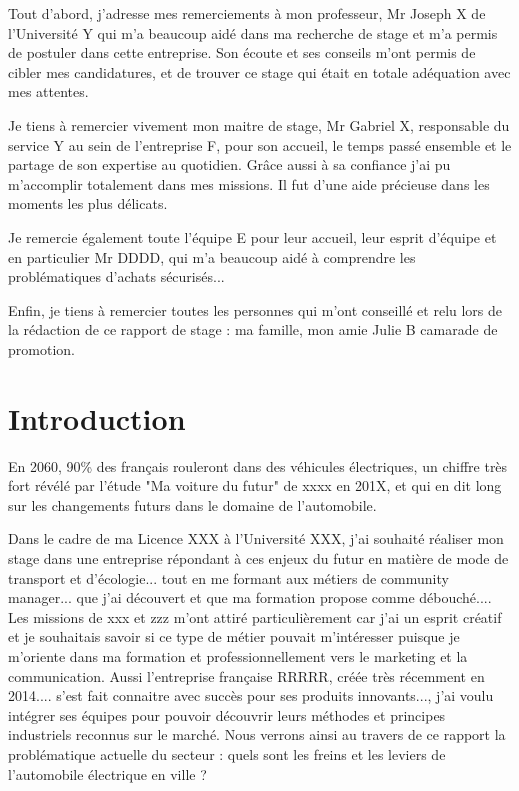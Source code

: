 \documentclass{article}
\begin{document}
Tout d'abord, j'adresse mes remerciements à mon professeur, Mr Joseph X de l'Université Y qui m'a beaucoup aidé dans ma recherche de stage et m'a permis de postuler dans cette entreprise. Son écoute et ses conseils m'ont permis de cibler mes candidatures, et de trouver ce stage qui était en totale adéquation avec mes attentes.

Je tiens à remercier vivement mon maitre de stage, Mr Gabriel X, responsable du service Y au sein de l'entreprise F, pour son accueil, le temps passé ensemble et le partage de son expertise au quotidien. Grâce aussi à sa confiance j'ai pu m'accomplir totalement dans mes missions. Il fut d'une aide précieuse dans les moments les plus délicats.

Je remercie également toute l'équipe E pour leur accueil, leur esprit d'équipe et en particulier Mr DDDD, qui m'a beaucoup aidé à comprendre les problématiques d'achats sécurisés...

Enfin, je tiens à remercier toutes les personnes qui m'ont conseillé et relu lors de la rédaction de ce rapport de stage : ma famille, mon amie Julie B camarade de promotion.


\newpage

\section{Introduction}


En 2060, 90\% des français rouleront dans des véhicules électriques, un chiffre très fort révélé par l'étude "Ma voiture du futur" de xxxx en 201X, et qui en dit long sur les changements futurs dans le domaine de l'automobile.

Dans le cadre de ma Licence XXX à l'Université XXX, j'ai souhaité réaliser mon stage dans une entreprise répondant à ces enjeux du futur en matière de mode de transport et d'écologie... tout en me formant aux métiers de community manager... que j'ai découvert et que ma formation propose comme débouché.... Les missions de xxx et zzz m'ont attiré particulièrement car j'ai un esprit créatif et je souhaitais savoir si ce type de métier pouvait m'intéresser puisque je m'oriente dans ma formation et professionnellement vers le marketing et la communication.
Aussi l'entreprise française RRRRR, créée très récemment en 2014.... s'est fait connaitre avec succès pour ses produits innovants..., j'ai voulu intégrer ses équipes pour pouvoir découvrir leurs méthodes et principes industriels reconnus sur le marché. Nous verrons ainsi au travers de ce rapport la problématique actuelle du secteur : quels sont les freins et les leviers de l'automobile électrique en ville ?
\end{document}
